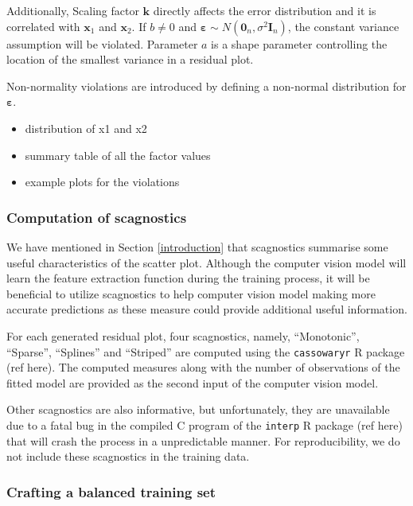 \documentclass[]{interact}
\theoremstyle{plain}%
\theoremstyle{definition}
\theoremstyle{remark}
\providecommand{\tightlist}{%
  \setlength{\itemsep}{0pt}\setlength{\parskip}{0pt}}
\def\tightlist{}
\begin{document}
Additionally, Scaling factor \(\boldsymbol{k}\) directly affects the
error distribution and it is correlated with \(\boldsymbol{x}_1\) and
\(\boldsymbol{x}_2\). If \(b \neq 0\) and
\(\boldsymbol{\varepsilon} \sim N(\boldsymbol{0}_n, \sigma^2\boldsymbol{I}_n)\),
the constant variance assumption will be violated. Parameter \(a\) is a
shape parameter controlling the location of the smallest variance in a
residual plot.

Non-normality violations are introduced by defining a non-normal
distribution for \(\boldsymbol{\varepsilon}\).

\begin{itemize}
\tightlist
\item
  distribution of x1 and x2
\item
  summary table of all the factor values
\item
  example plots for the violations
\end{itemize}

\hypertarget{computation-of-scagnostics}{%
\subsubsection{Computation of
scagnostics}\label{computation-of-scagnostics}}

We have mentioned in Section \ref{introduction} that scagnostics
summarise some useful characteristics of the scatter plot. Although the
computer vision model will learn the feature extraction function during
the training process, it will be beneficial to utilize scagnostics to
help computer vision model making more accurate predictions as these
measure could provide additional useful information.

For each generated residual plot, four scagnostics, namely,
``Monotonic'', ``Sparse'', ``Splines'' and ``Striped'' are computed
using the \texttt{cassowaryr} R package (ref here). The computed
measures along with the number of observations of the fitted model are
provided as the second input of the computer vision model.

Other scagnostics are also informative, but unfortunately, they are
unavailable due to a fatal bug in the compiled C program of the
\texttt{interp} R package (ref here) that will crash the process in a
unpredictable manner. For reproducibility, we do not include these
scagnostics in the training data.

\hypertarget{crafting-a-balanced-training-set}{%
\subsubsection{Crafting a balanced training
set}\label{crafting-a-balanced-training-set}}
\end{document}
